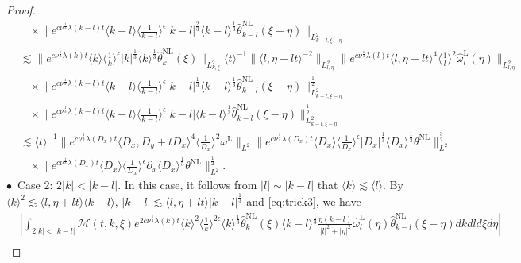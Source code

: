 \documentclass[reqno, 12pt]{amsart} %
\theoremstyle{plain} %
\theoremstyle{definition}
\theoremstyle{remark}
\numberwithin{equation}{section} %
\newcommand{\no}{\nonumber}
\newcommand{\px}{\partial_x}
\begin{document}
\begin{proof}
\begin{align}
			&\no \quad \times\|e^{c \nu^{\frac{1}{3}} \lambda(k-l) t}\langle k-l\rangle\langle\frac{1}{k-l}\rangle^\epsilon|k-l|^\frac23 \langle k-l \rangle^\frac13 \hat{\theta}_{k-l}^{\mathrm{NL}}(\xi-\eta)\|_{L_{k-l, \xi-\eta}^2} \\
			&\no \lesssim\|e^{c \nu^{\frac{1}{3}} \lambda(k) t}\langle k\rangle\langle\frac{1}{k}\rangle^\epsilon|k|^{\frac{1}{3}}  \langle k \rangle^\frac13 \hat{\theta}_k^{\mathrm{NL}}(\xi)\|_{L_{k, \xi}^2}\langle t\rangle^{-1}\|\langle l, \eta+l t\rangle^{-2}\|_{L_{l, \eta}^2}\|e^{c \nu^{\frac{1}{3}} \lambda(l) t}\langle l, \eta+l t\rangle^4\langle\frac{1}{l}\rangle^2 \hat{\omega}_l^{\mathrm{L}}(\eta)\|_{L_{l, \eta}^2} \\
			&\no \quad \times\|e^{c \nu^{\frac{1}{3}} \lambda(k-l) t}\langle k-l\rangle\langle\frac{1}{k-l}\rangle^\epsilon|k-l|^\frac13  \langle k-l \rangle^\frac13 \hat{\theta}_{k-l}^{\mathrm{NL}}(\xi-\eta)\|_{L_{k-l, \xi-\eta}^2}^\frac12 \\
			&\no\quad \times \|e^{c \nu^{\frac{1}{3}} \lambda(k-l) t}\langle k-l\rangle\langle\frac{1}{k-l}\rangle^\epsilon|k-l| \langle k-l \rangle^\frac13 \hat{\theta}_{k-l}^{\mathrm{NL}}(\xi-\eta)\|_{L_{k-l, \xi-\eta}^2}^\frac12  \\
			&\no \lesssim \langle t\rangle^{-1} \|e^{c \nu^{\frac{1}{3}} \lambda\left(D_x\right) t}\langle D_x, D_y+t D_x\rangle^4\langle\frac{1}{D_x}\rangle^2 \omega^{\mathrm{L}}\|_{L^2}  \|e^{c \nu^{\frac{1}{3}} \lambda\left(D_x\right) t}\langle D_x\rangle\langle\frac{1}{D_x}\rangle^\epsilon\left|D_x\right|^{\frac{1}{3}} \langle D_x \rangle^\frac13 \theta^{\mathrm{NL}}\|_{L^2}^{\frac{3}{2}} \\
			& \quad \times  \|e^{c \nu^{\frac{1}{3}} \lambda\left(D_x\right) t}\langle D_x\rangle\langle\frac{1}{D_x}\rangle^\epsilon \px \langle D_x \rangle^\frac13  \theta^{\mathrm{NL}}\|_{L^2}^{\frac{1}{2}} .
		\end{align}
		$\bullet$~Case 2:  $2|k|<|k-l|$. In this case, it follows from $|l| \sim |k-l|$ that $\langle k\rangle \lesssim\langle l\rangle$. By $\langle k \rangle^2 \lesssim \langle  l, \eta + lt\rangle \langle k-l \rangle$,  $|k-l| \lesssim \langle  l, \eta + lt\rangle |k-l|^\frac13 $ and \eqref{eq:trick3}, we have
		\begin{equation}\begin{aligned} \label{eq:temp18}
				&\left|\int_{2|k|<|k-l|} \mathcal{M}(t, k, \xi) e^{2 c \nu^{\frac{1}{3}} \lambda(k) t}\langle k\rangle^2\langle\frac{1}{k}\rangle^{2 \epsilon} \langle k \rangle^\frac13  \hat{\theta }_k^{\mathrm{NL}}(\xi) \langle k-l \rangle^\frac13 \frac{\eta(k-l)}{|l|^2+|\eta|^2} \hat{\omega}_l^{\mathrm{L}}(\eta) \hat{\theta }_{k-l}^{\mathrm{NL}}(\xi-\eta) d k d l d \xi d \eta\right| \\

\end{aligned}
\end{equation}
\end{proof}
\end{document}
